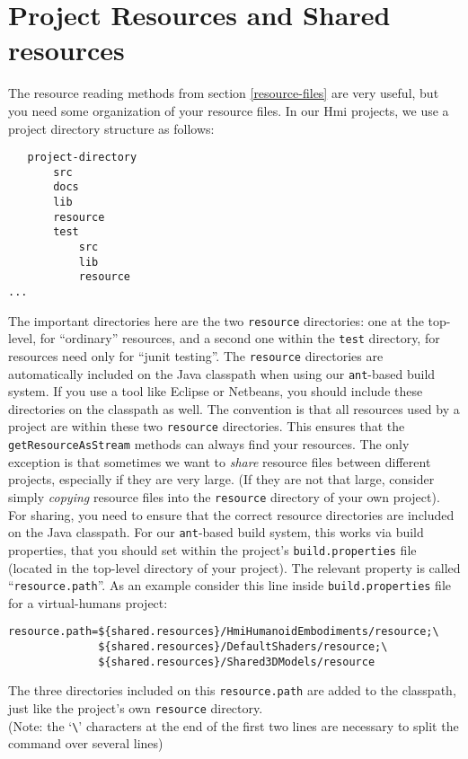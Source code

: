 \section{Project Resources and Shared resources}

The resource reading methods from section \ref{resource-files} are very useful, but you need some
organization of your resource files.
In our Hmi projects, we use a project directory structure as follows:
\begin{verbatim}
   project-directory
       src
       docs
       lib
       resource
       test
           src
           lib
           resource
...
\end{verbatim}
The important directories here are the two \verb#resource# directories: one at the top-level,
for ``ordinary'' resources, and a second one within the \verb#test# directory, for resources need only
for ``junit testing''.
The \verb#resource# directories are automatically included on the Java classpath when using our
\verb#ant#-based build system. If you use a tool like Eclipse or Netbeans, you should include these
directories on the classpath as well.
The convention is that all resources used by a project are within these two \verb#resource# directories.
This ensures that the \verb#getResourceAsStream# methods can always find your resources.
The only exception is that sometimes we want to \emph{share} resource files between different projects,
especially if they are very large. (If they are not that large, consider simply \emph{copying} resource files
into the \verb#resource# directory of your own project).
For sharing, you need to ensure that the correct resource directories are included on the Java classpath.
For our \verb#ant#-based build system, this works via build properties, that you should set
within the project's \verb#build.properties# file (located in the top-level directory of your project).
The relevant property is called ``\verb#resource.path#''. As an example consider this line inside
 \verb#build.properties# file for a virtual-humans project:
 \begin{verbatim}
resource.path=${shared.resources}/HmiHumanoidEmbodiments/resource;\
              ${shared.resources}/DefaultShaders/resource;\
              ${shared.resources}/Shared3DModels/resource
 \end{verbatim}
 The three directories included on this \verb#resource.path# are added to the classpath, just like the
 project's own \verb#resource# directory.\\
(Note: the `\verb#\#' characters at the end of the first two lines are necessary to split the command over several lines)\\
